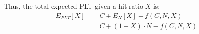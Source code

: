 Thus, the total expected PLT given a hit ratio $X$ is:
\begin{align*}
E_{PLT}[X] & = C + E_N[X] - f(C,N,X) \\
& = C + (1 - X) \cdot N - f(C,N,X)
\end{align*}


